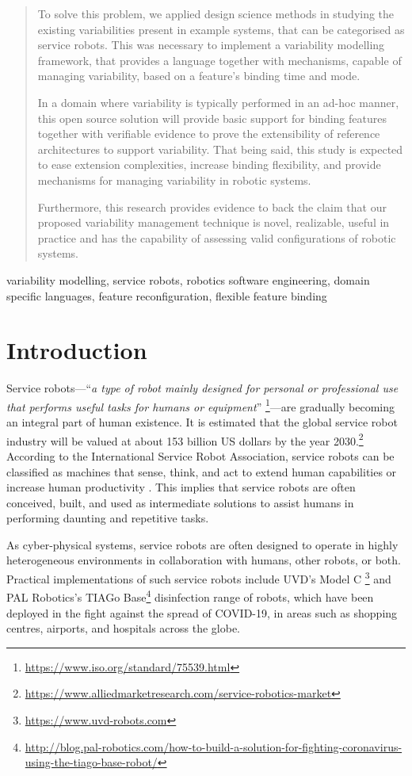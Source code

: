 \documentclass[conference]{IEEEtran}
\newcommand{\foot}[1]{\footnote{\url{#1}}}
\begin{document}
\begin{abstract}
To solve this problem, we applied design science methods in studying the existing variabilities present in example systems, that can be categorised as service robots. This was necessary to implement a variability modelling framework, that provides a language together with mechanisms, capable of managing variability, based on a feature's binding time and mode. 

In a domain where variability is typically performed in an ad-hoc manner, this open source solution will provide basic support for binding features together with verifiable evidence to prove the extensibility of reference architectures to support variability. That being said, this study is expected to ease extension complexities, increase binding flexibility, and provide mechanisms for managing variability in robotic systems.

Furthermore, this research provides evidence to back the claim that our proposed variability management technique is novel, realizable, useful in practice and has the capability of assessing valid configurations of robotic systems.
\end{abstract}

\begin{IEEEkeywords}
variability modelling, service robots, robotics software engineering, domain specific languages, feature reconfiguration, flexible feature binding
\end{IEEEkeywords}

\section{Introduction}
\label{section:intro}
Service robots---``{\em a type of robot mainly designed for personal or professional use that performs useful tasks for humans or equipment}'' \foot{https://www.iso.org/standard/75539.html}---are gradually becoming an integral part of human existence. It is estimated that the global service robot industry will be valued at about 153 billion US dollars by the year 2030.\foot{https://www.alliedmarketresearch.com/service-robotics-market}
According to the International Service Robot Association, service robots can be classified as machines that sense, think, and act to extend human capabilities or increase human productivity \cite{serv-rob-his}. This implies that service robots are often conceived, built, and used as intermediate solutions to assist humans in performing daunting and repetitive tasks.

As cyber-physical systems, service robots are often designed to operate in highly heterogeneous environments in collaboration with humans, other robots, or both. Practical implementations of such service robots include UVD's Model C \foot{https://www.uvd-robots.com} and PAL Robotics's TIAGo Base\foot{http://blog.pal-robotics.com/how-to-build-a-solution-for-fighting-coronavirus-using-the-tiago-base-robot/} 
disinfection range of robots, which have been deployed in the fight against the spread of COVID-19, in areas such as shopping centres, airports, and hospitals across the globe.
\end{document}
